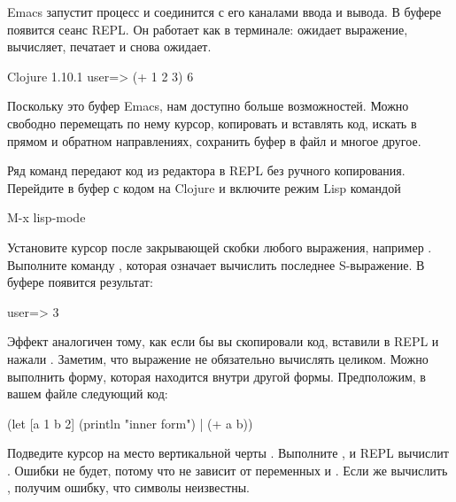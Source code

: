 Emacs запустит процесс и соединится с его каналами ввода и вывода. В буфере  появится сеанс REPL. Он работает как в терминале: ожидает выражение, вычисляет, печатает и снова ожидает.

\begin{english}
  \begin{clojure}
Clojure 1.10.1
user=> (+ 1 2 3)
6
  \end{clojure}
\end{english}

Поскольку это буфер Emacs, нам доступно больше возможностей. Можно свободно перемещать по нему курсор, копировать и вставлять код, искать в прямом и обратном направлениях, сохранить буфер в файл и многое другое.

Ряд команд передают код из редактора в REPL без ручного копирования. Перейдите в буфер с кодом на Clojure и включите режим Lisp командой

\begin{english}
  \begin{text}
M-x lisp-mode
  \end{text}
\end{english}

Установите курсор после закрывающей скобки любого выражения, например . Выполните команду , которая означает вычислить последнее S-выражение. В буфере  появится результат:

\begin{english}
  \begin{text}
user=> 3
  \end{text}
\end{english}

Эффект аналогичен тому, как если бы вы скопировали код, вставили в REPL и нажали \enter. Заметим, что выражение не обязательно вычислять целиком. Можно выполнить форму, которая находится внутри другой формы. Предположим, в вашем файле следующий код:

\begin{english}
  \begin{clojure/lines}
(let [a 1 b 2]
  (println "inner form") |
  (+ a b))
  \end{clojure/lines}
\end{english}

Подведите курсор на место вертикальной черты . Выполните , и REPL вычислит . Ошибки не будет, потому что  не зависит от переменных  и . Если же вычислить , получим ошибку, что символы неизвестны.

